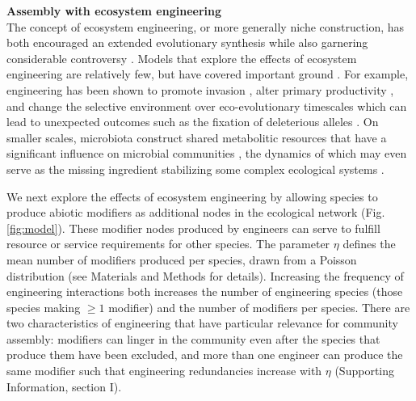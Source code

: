 \documentclass[twocolumn,preprintnumbers,amsmath,amssymb,superscriptaddress]{revtex4}
\begin{document}
\vspace{-3mm}
\noindent \textbf{Assembly with ecosystem engineering}\\
The concept of ecosystem engineering, or more generally niche construction, has both encouraged an extended evolutionary synthesis \cite{Laland2015} while also garnering considerable controversy \cite{Gupta2017,Feldman2017}.
Models that explore the effects of ecosystem engineering are relatively few, but have covered important ground \cite{Hastings2007,OdlingSmee2013}.
For example, engineering has been shown to promote invasion \cite{Cuddington2004}, alter primary productivity \cite{Wright2004}, and change the selective environment over eco-evolutionary timescales \cite{Kylafis2008,Krakauer2009} which can lead to unexpected outcomes such as the fixation of deleterious alleles \cite{Laland1999}.
On smaller scales, microbiota construct shared metabolitic resources that have a significant influence on microbial communities \cite{Kallus2017}, the dynamics of which may even serve as the missing ingredient stabilizing some complex ecological systems \cite{Muscarella2017}.


We next explore the effects of ecosystem engineering by allowing species to produce abiotic modifiers as additional nodes in the ecological network (Fig. \ref{fig:model}).
These modifier nodes produced by engineers can serve to fulfill resource or service requirements for other species.
The parameter $\eta$ defines the mean number of modifiers produced per species, drawn from a Poisson distribution (see Materials and Methods for details).
Increasing the frequency of engineering interactions both increases the number of engineering species (those species making $\geq 1$ modifier) and the number of modifiers per species.
There are two characteristics of engineering that have particular relevance for community assembly:
modifiers can linger in the community even after the species that produce them have been excluded, and
more than one engineer can produce the same modifier such that engineering redundancies increase with $\eta$ (Supporting Information, section I).
\end{document}
